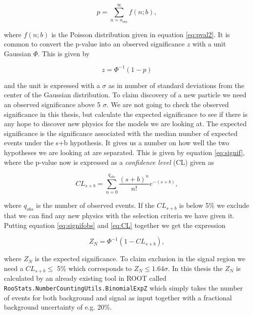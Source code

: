 \begin{equation}
    \label{eq:pvalues}
    p = \sum_{n=n_{obs}}^\infty f(n;b),
\end{equation}


where $f(n;b)$ is the Poisson distribution given in equation \ref{eq:pval2}. It is common to convert the p-value into an observed significance $z$ with a unit Gaussian $\Phi$. This is given by

\begin{equation}
    \label{eq:signifobs}
    z = \Phi^{-1}(1-p)
\end{equation}

 and the unit is expressed with a $\sigma$ as in number of standard deviations from the center of the Gaussian distribution. To claim discovery of a new particle we need an observed significance above 5 $\sigma$. We are not going to check the observed significance in this thesis, but calculate the expected significance to see if there is any hope to discover new physics for the models we are looking at. The expected significance is the significance associated with the median number of expected events under the s+b hypothesis. It gives us a number on how well the two hypotheses we are looking at are separated. This is given by equation \ref{eq:signif}, where the p-value now is expressed as a \textit{confidence level} (CL) given as
 
 \begin{equation}
    \label{eq:CL}
    CL_{s+b} = \sum_{n=0}^{q_{obs}} \frac{(s+b)^n}{n!} e^{-(s+b)},
 \end{equation}

where $q_{obs}$ is the number of observed events. If the $CL_{s+b}$ is below 5\% we exclude that we can find any new physics with the selection criteria we have given it. Putting equation \ref{eq:signifobs} and \ref{eq:CL} together we get the expression

\begin{equation}
    \label{eq:signif}
    Z_N = \Phi^{-1}(1-CL_{s+b}),
\end{equation}

where $Z_N$ is the expected significance. To claim exclusion in the signal region we need a $CL_{s+b} \leq$ 5\% which corresponds to $Z_N \leq 1.64 \sigma$. In this thesis the $Z_N$ is calculated by an already existing tool in ROOT called \texttt{RooStats.NumberCountingUtils.BinomialExpZ} which simply takes the number of events for both background and signal as input together with a fractional background uncertainty of e.g. 20\%.







